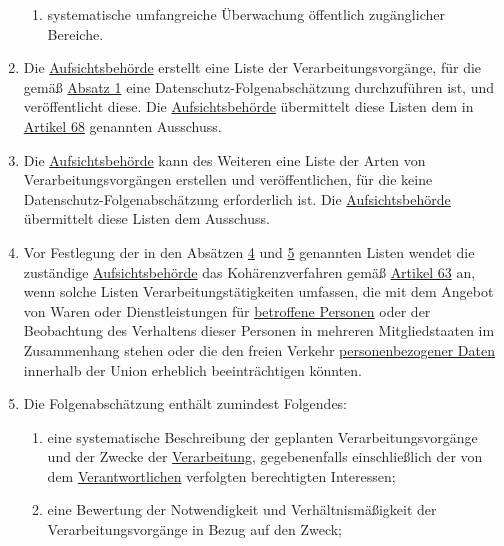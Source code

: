 \begin{enumerate}
\begin{enumerate}
    \item systematische umfangreiche Überwachung öffentlich zugänglicher Bereiche.
    \label{itm:35-3c}

  \end{enumerate}

  \item Die \hyperref[itm:04-21]{Aufsichtsbehörde} erstellt eine Liste der Verarbeitungsvorgänge, für die gemäß \hyperref[itm:35-1]{Absatz 1}
   eine Datenschutz-Folgenabschätzung durchzuführen ist, und veröffentlicht diese. Die \hyperref[itm:04-21]{Aufsichtsbehörde} übermittelt
   diese Listen dem in \hyperref[ch:68]{Artikel 68} genannten Ausschuss.
  \label{itm:35-4}

  \item Die \hyperref[itm:04-21]{Aufsichtsbehörde} kann des Weiteren eine Liste der Arten von Verarbeitungsvorgängen erstellen und
   veröffentlichen, für die keine Datenschutz-Folgenabschätzung erforderlich ist. Die \hyperref[itm:04-21]{Aufsichtsbehörde} übermittelt
   diese Listen dem Ausschuss.
  \label{itm:35-5}

  \item Vor Festlegung der in den Absätzen \hyperref[itm:35-4]{4} und \hyperref[itm:35-5]{5} genannten Listen wendet die
   zuständige \hyperref[itm:04-21]{Aufsichtsbehörde} das Kohärenzverfahren gemäß \hyperref[ch:63]{Artikel 63} an, wenn solche Listen
   Verarbeitungstätigkeiten umfassen, die mit dem Angebot von Waren oder Dienstleistungen für \hyperref[itm:04-1]{betroffene Personen} oder
   der Beobachtung des Verhaltens dieser Personen in mehreren Mitgliedstaaten im Zusammenhang stehen oder die den
   freien Verkehr \hyperref[itm:04-1]{personenbezogener Daten} innerhalb der Union erheblich beeinträchtigen könnten.
  \label{itm:35-6}

  \item Die Folgenabschätzung enthält zumindest Folgendes:
  \label{itm:35-7}

  \begin{enumerate}
  
    \item eine systematische Beschreibung der geplanten Verarbeitungsvorgänge und der Zwecke der \hyperref[itm:04-2]{Verarbeitung},
     gegebenenfalls einschließlich der von dem \hyperref[itm:04-7]{Verantwortlichen} verfolgten berechtigten Interessen;
    \label{itm:35-7a}

    \item eine Bewertung der Notwendigkeit und Verhältnismäßigkeit der Verarbeitungsvorgänge in Bezug auf den Zweck;
    \label{itm:35-7b}


\end{enumerate}
\end{enumerate}
